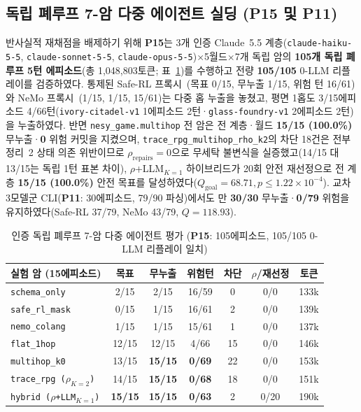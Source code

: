 \subsection{독립 폐루프 7-암 다중 에이전트 실딩 (\textbf{P15} 및 \textbf{P11})}\label{sec:phase5-mas}
반사실적 재채점을 배제하기 위해 \textbf{P15}는 3개 인증 Claude~5.5 계층(\texttt{claude-haiku-5-5}, \texttt{claude-sonnet-5-5}, \texttt{claude-opus-5-5})$\times$5월드$\times$7개 독립 암의 \textbf{105개 독립 폐루프 5턴 에피소드}(총 1,048,803토큰; 표~\ref{tab:phase5-aamas-mas})를 수행하고 전량 \textbf{105/105} 0-LLM 리플레이를 검증하였다. 통제된 Safe-RL 프록시~\cite{alshiekh2018shield}(목표 0/15, 무누출 1/15, 위험 턴 16/61)와 NeMo 프록시~\cite{rebedea2023nemo}(1/15, 1/15, 15/61)는 다중 홉 누출을 놓쳤고, 평면 1홉도 3/15에피소드 4/66턴(\texttt{ivory-citadel-v1} 1에피소드 2턴·\texttt{glass-foundry-v1} 2에피소드 2턴)을 누출하였다. 반면 \texttt{nesy\_game.multihop} 전 암은 전 계층·월드 \textbf{15/15 (100.0\%)} 무누출·\textbf{0} 위험 커밋을 지켰으며, \texttt{trace\_rpg\_multihop\_rho\_k2}의 차단 18건은 전부 정리~2 상태 의존 위반이므로 $\rho_{\mathrm{repairs}}{=}0$으로 무세탁 불변식을 실증했고(14/15 대 13/15는 독립 1턴 표본 차이), $\rho$+LLM$_{K=1}$ 하이브리드가 20회 안전 재선정으로 전 계층 \textbf{15/15 (100.0\%)} 안전 목표를 달성하였다($Q_{\mathrm{goal}}{=}68.71, p{\le}1.22{\times}10^{-4}$). 교차 3모델군 CLI(\textbf{P11}: 30에피소드, 79/90 파싱)에서도 \system{}만 \textbf{30/30} 무누출·\textbf{0/79} 위험을 유지하였다(Safe-RL 37/79, NeMo 43/79, $Q{=}118.93$).

\begin{table}[!tbp]
\caption{인증 독립 폐루프 7-암 다중 에이전트 평가 (\textbf{P15}: 105에피소드, 105/105 0-LLM 리플레이 일치)}
\label{tab:phase5-aamas-mas}
\centering
\scriptsize
\setlength{\tabcolsep}{2.2pt}
\begin{tabularx}{\columnwidth}{@{}>{\raggedright\arraybackslash}Xcccccc@{}}
\toprule
\textbf{실험 암 (15에피소드)} & \textbf{목표} & \textbf{무누출} & \textbf{위험턴} & \textbf{차단} & \textbf{$\rho$/재선정} & \textbf{토큰} \\
\midrule
\texttt{schema\_only} & 2/15 & 2/15 & 16/59 & 0 & 0/0 & 133k \\
\texttt{safe\_rl\_mask}~\cite{alshiekh2018shield} & 0/15 & 1/15 & 16/61 & 2 & 0/0 & 139k \\
\texttt{nemo\_colang}~\cite{rebedea2023nemo} & 1/15 & 1/15 & 15/61 & 1 & 0/0 & 137k \\
\texttt{flat\_1hop} & 12/15 & 12/15 & 4/66 & 15 & 0/0 & 146k \\
\texttt{multihop\_k0} & 13/15 & \textbf{15/15} & \textbf{0/69} & 22 & 0/0 & 153k \\
\texttt{trace\_rpg ($\rho_{K=2}$)} & 14/15 & \textbf{15/15} & \textbf{0/68} & 18 & 0/0 & 151k \\
\texttt{hybrid ($\rho$+LLM$_{K=1}$)} & \textbf{15/15} & \textbf{15/15} & \textbf{0/63} & 2 & 0/20 & 190k \\
\bottomrule
\end{tabularx}
\end{table}

